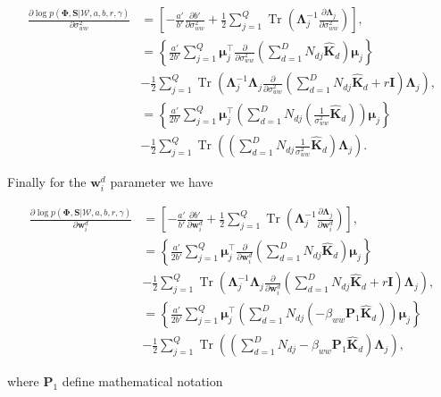 \documentclass[]{article}
\newcommand{\C}{\boldsymbol{\Lambda}_j}
\newcommand{\muJ}{\boldsymbol{\mu}_j}
\newcommand{\W}{\boldsymbol{\mathcal{W}}}
\newcommand{\comment}[2]{{\color{blue}#1} {\color{red}#2}}
\newcommand{\wIj}[1]{\mathbf{w}_{#1}^d}
\newcommand{\Kaww}{\mathbf{\hat{K}}_d }
\newcommand{\likel}{\log p\left(\boldsymbol{\Phi},\mathbf{S}|\W,a,b,r,\gamma\right)}
\begin{document}
\begin{align}
\frac{\partial \likel}{\partial \sigma^2_{ww}} &= \left[-\frac{a'}{b'}\frac{\partial b'}{\partial\sigma^2_{ww}} + \frac{1}{2}\sum_{j=1}^{Q} \operatorname{Tr}\left(\C^{-1}\frac{\partial \C}{\partial \sigma^2_{ww}}\right)\right], \\
& =  \left\{\frac{a'}{2b'}\sum\limits_{j=1}^{Q}\boldsymbol{\mu}_j^\top \frac{\partial }{\partial \sigma^2_{ww}}\left(\sum\limits_{d=1}^{D}{N_{dj}\Kaww}\right)\muJ\right\} \\
&-\frac{1}{2}\sum_{j=1}^{Q} \operatorname{Tr}\left(\C^{-1}\C \frac{\partial }{\partial \sigma^2_{ww}}\left(\sum\limits_{d=1}^{D}{N_{dj}\Kaww+r\mathbf{I}}\right)\C\right),\\
& =  \left\{\frac{a'}{2b'}\sum\limits_{j=1}^{Q}\boldsymbol{\mu}_j^\top \left(\sum\limits_{d=1}^{D}{N_{dj}\left(\frac{1}{\sigma^2_{ww}}\Kaww\right)}\right)\muJ\right\} \\
&-\frac{1}{2}\sum_{j=1}^{Q} \operatorname{Tr}\left( \left(\sum\limits_{d=1}^{D}{N_{dj}
\frac{1}{\sigma^2_{ww}}\Kaww}\right)\C\right).
\end{align}

Finally for the $\wIj{i}$ parameter we have

\begin{align}
\frac{\partial \likel}{\partial \wIj{i}} &= \left[-\frac{a'}{b'}\frac{\partial b'}{\partial\wIj{i}} + \frac{1}{2}\sum_{j=1}^{Q} \operatorname{Tr}\left(\C^{-1}\frac{\partial \C}{\partial \wIj{i}}\right)\right], \\
& =  \left\{\frac{a'}{2b'}\sum\limits_{j=1}^{Q}\boldsymbol{\mu}_j^\top \frac{\partial }{\partial \wIj{i}}\left(\sum\limits_{d=1}^{D}{N_{dj}\Kaww}\right)\muJ\right\} \\
&-\frac{1}{2}\sum_{j=1}^{Q} \operatorname{Tr}\left(\C^{-1}\C \frac{\partial }{\partial \wIj{i}}\left(\sum\limits_{d=1}^{D}{N_{dj}\Kaww+r\mathbf{I}}\right)\C\right),\\
& =  \left\{\frac{a'}{2b'}\sum\limits_{j=1}^{Q}\boldsymbol{\mu}_j^\top \left(\sum\limits_{d=1}^{D}{N_{dj}\left(-\beta_{ww}\mathbf{P}_1\Kaww\right)}\right)\muJ\right\} \\
&-\frac{1}{2}\sum_{j=1}^{Q} \operatorname{Tr}\left( \left(\sum\limits_{d=1}^{D}{N_{dj}
	-\beta_{ww}\mathbf{P}_1\Kaww}\right)\C\right),
\end{align}

where \comment{$\mathbf{P}_1$}{define mathematical notation}



\end{document}
